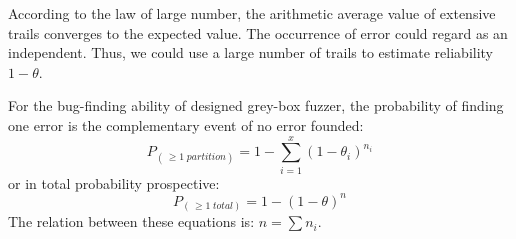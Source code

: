 According to the law of large number\cite{papoulis2002probability}, the arithmetic average value of extensive trails converges to the expected value. The occurrence of error could regard as an independent. Thus, we could use a large number of trails to estimate reliability $1-\theta$.

For the bug-finding ability of designed grey-box fuzzer, the probability of finding one error is the complementary event of no error founded:
\begin{equation}
    P_{(\,\ge 1\; partition)}=1-\sum_{i=1}^{x}(1-\theta_{i})^{n_{i}}
\end{equation}
or in total probability prospective:
\begin{equation}
    P_{(\,\ge 1\; total)}=1-(1-\theta)^n
\end{equation}
The relation between these equations is: $n= \sum n_{i}$.
